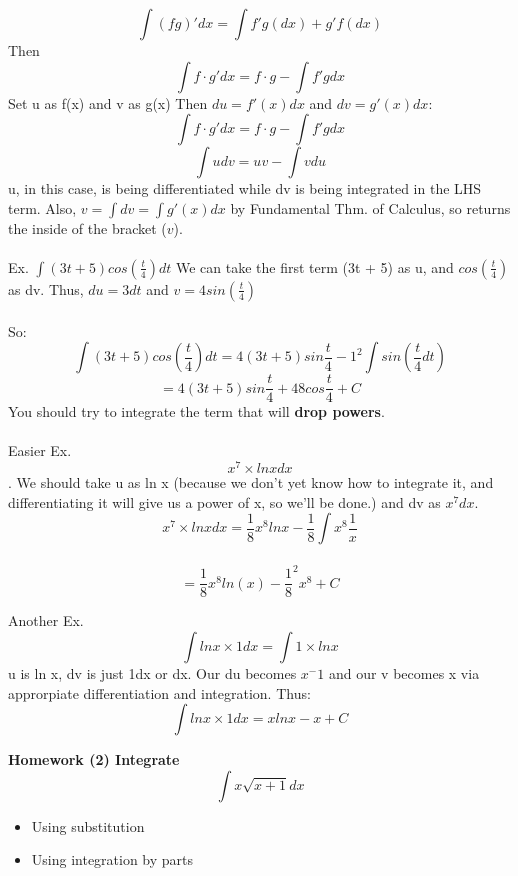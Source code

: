 \documentclass[twocolumn, 12pt]{report}
\begin{document}
  $$\int (fg)' dx = \int f'g(dx) + g'f (dx)$$
  Then
  $$\int f\cdot g' dx = f\cdot g - \int f'gdx$$
  Set u as f(x) and v as g(x)
  Then $du = f'(x) dx$ and $dv = g'(x) dx$:
  $$\int f\cdot g' dx = f\cdot g - \int f'gdx$$
  $$\int udv = uv - \int vdu$$
  u, in this case, is being differentiated while dv is being integrated in the LHS term. Also, $v = \int dv = \int g'(x)dx$ by Fundamental Thm. of Calculus, so returns the inside of the bracket ($v$).\\\\

  Ex. $\int (3t + 5) cos (\frac{t}{4}) dt$
  We can take the first term (3t + 5) as u, and $cos (\frac{t}{4})$ as dv.
  Thus, $du = 3 dt$ and $v = 4sin(\frac{t}{4})$ \\\\
  So: $$\int (3t + 5) cos (\frac{t}{4}) dt = 4(3t + 5)sin\frac{t}{4} -1^2\int sin(\frac{t}{4} dt)$$ $$= 4(3t + 5)sin \frac {t}{4} + 48cos\frac{t}{4} + C$$
You should try to integrate the term that will \textbf{drop powers}.\\\\

  Easier Ex. $$x^7 \times lnx dx$$. We should take u as ln x (because we don't yet know how to integrate it, and differentiating it will give us a power of x, so we'll be done.) and dv as $x^7 dx$.
   $$x^7 \times lnx dx = \frac{1}{8}x^8 lnx - \frac{1}{8}\int{x^8 \frac{1}{x}}$$\\ $$= \frac{1}{8}x^8 ln(x) - \frac{1}{8}^2x^8 + C$$

   Another Ex. $$\int lnx\times 1 dx = \int 1 \times ln x$$
   u is ln x, dv is just 1dx or dx. Our du becomes $x^-1$ and our v becomes x via approrpiate differentiation and integration. Thus:
   $$\int lnx\times 1 dx = xlnx - x +C$$

   \textbf{Homework (2) Integrate $$\int x \sqrt{x+1} dx$$}
   \begin{itemize}
     \item Using substitution
     \item Using integration by parts
   \end {itemize}
\end{document}
